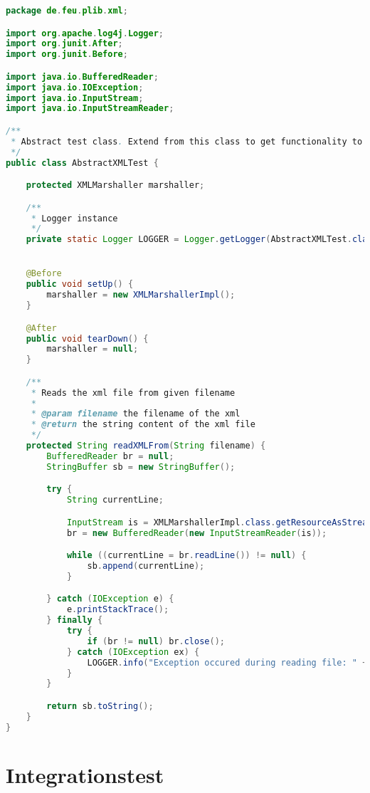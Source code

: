 \begin{lstlisting}[caption=Abstrakte Unit Testklasse, language=Java, label=lst:abstrakte_unit_testklasse]
package de.feu.plib.xml;

import org.apache.log4j.Logger;
import org.junit.After;
import org.junit.Before;

import java.io.BufferedReader;
import java.io.IOException;
import java.io.InputStream;
import java.io.InputStreamReader;

/**
 * Abstract test class. Extend from this class to get functionality to read XML files for your test.
 */
public class AbstractXMLTest {

    protected XMLMarshaller marshaller;

    /**
     * Logger instance
     */
    private static Logger LOGGER = Logger.getLogger(AbstractXMLTest.class);


    @Before
    public void setUp() {
        marshaller = new XMLMarshallerImpl();
    }

    @After
    public void tearDown() {
        marshaller = null;
    }

    /**
     * Reads the xml file from given filename
     *
     * @param filename the filename of the xml
     * @return the string content of the xml file
     */
    protected String readXMLFrom(String filename) {
        BufferedReader br = null;
        StringBuffer sb = new StringBuffer();

        try {
            String currentLine;

            InputStream is = XMLMarshallerImpl.class.getResourceAsStream(filename);
            br = new BufferedReader(new InputStreamReader(is));

            while ((currentLine = br.readLine()) != null) {
                sb.append(currentLine);
            }

        } catch (IOException e) {
            e.printStackTrace();
        } finally {
            try {
                if (br != null) br.close();
            } catch (IOException ex) {
                LOGGER.info("Exception occured during reading file: " + ex);
            }
        }

        return sb.toString();
    }
}
\end{lstlisting}  

\section{Integrationstest}

